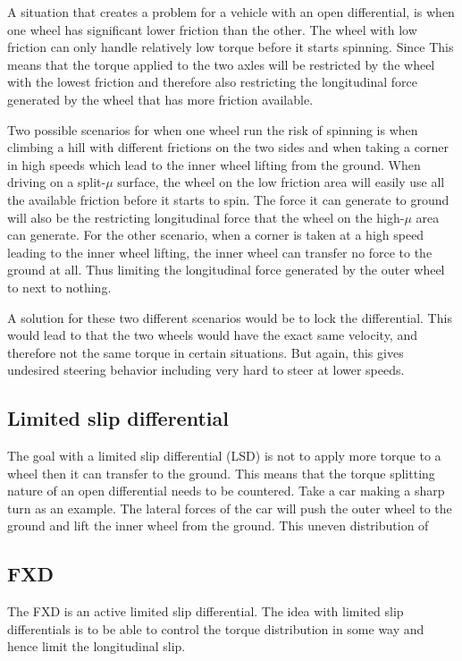 A situation that creates a problem for a vehicle with an open differential, is when one wheel has significant lower friction than the other. The wheel with low friction can only handle relatively low torque before it starts spinning. Since  This means that the torque applied to the two axles will be restricted by the wheel with the lowest friction and therefore also restricting the longitudinal force generated by the wheel that has more friction available.

Two possible scenarios for when one wheel run the risk of spinning is when climbing a hill with different frictions on the two sides and when taking a corner in high speeds which lead to the inner wheel lifting from the ground. When driving on a split-$ \mu $ surface, the wheel on the low friction area will easily use all the available friction before it starts to spin. The force it can generate to ground will also be the restricting longitudinal force that the wheel on the high-$ \mu $ area can generate. For the other scenario, when a corner is taken at a high speed leading to the inner wheel lifting, the inner wheel can transfer no force to the ground at all. Thus limiting the longitudinal force generated by the outer wheel to next to nothing. 

A solution for these two different scenarios would be to lock the differential. This would lead to that the two wheels would have the exact same velocity, and therefore not the same torque in certain situations. But again, this gives undesired steering behavior including very hard to steer at lower speeds. 

\subsection{Limited slip differential}
The goal with a limited slip differential (LSD) is not to apply more torque to a wheel then it can transfer to the ground. This means that the torque splitting nature of an open differential needs to be countered. Take a car making a sharp turn as an example. The lateral forces of the car will push the outer wheel to the ground and lift the inner wheel from the ground. This uneven distribution of 

\subsection{FXD}
The FXD is an active limited slip differential. The idea with limited slip differentials is to be able to control the torque distribution in some way and hence limit the longitudinal slip. 


